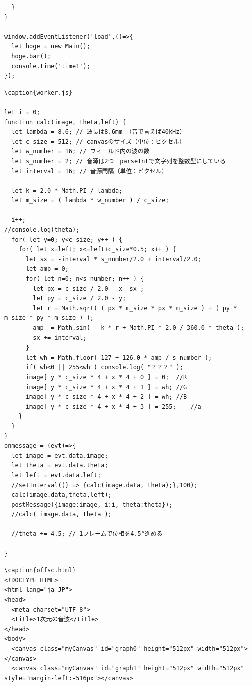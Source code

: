 \documentclass[a4j,12pt]{jsarticle}
\begin{document}
{\begin{lstlisting}
  }
}

window.addEventListener('load',()=>{
  let hoge = new Main();
  hoge.bar();
  console.time('time1');
});

\end{lstlisting}
\newpage

\begin{lstlisting}
\caption{worker.js}

let i = 0;
function calc(image, theta,left) {
  let lambda = 8.6; // 波長は8.6mm （音で言えば40kHz）
  let c_size = 512; // canvasのサイズ（単位：ピクセル）
  let w_number = 16; // フィールド内の波の数
  let s_number = 2; // 音源は2つ　parseIntで文字列を整数型にしている
  let interval = 16; // 音源間隔（単位：ピクセル）

  let k = 2.0 * Math.PI / lambda;
  let m_size = ( lambda * w_number ) / c_size;

  i++;
//console.log(theta);
  for( let y=0; y<c_size; y++ ) {
    for( let x=left; x<=left+c_size*0.5; x++ ) {
      let sx = -interval * s_number/2.0 + interval/2.0;
      let amp = 0;
      for( let n=0; n<s_number; n++ ) {
        let px = c_size / 2.0 - x- sx ;
        let py = c_size / 2.0 - y;
        let r = Math.sqrt( ( px * m_size * px * m_size ) + ( py * m_size * py * m_size ) );
        amp -= Math.sin( - k * r + Math.PI * 2.0 / 360.0 * theta );
        sx += interval;
      }
      let wh = Math.floor( 127 + 126.0 * amp / s_number );
      if( wh<0 || 255<wh ) console.log( "？？？" );
      image[ y * c_size * 4 + x * 4 + 0 ] = 0;  //R
      image[ y * c_size * 4 + x * 4 + 1 ] = wh; //G
      image[ y * c_size * 4 + x * 4 + 2 ] = wh; //B
      image[ y * c_size * 4 + x * 4 + 3 ] = 255;    //a
    }
  }
}
onmessage = (evt)=>{
  let image = evt.data.image;
  let theta = evt.data.theta;
  let left = evt.data.left;
  //setInterval(() => {calc(image.data, theta);},100);
  calc(image.data,theta,left);
  postMessage({image:image, i:i, theta:theta});
  //calc( image.data, theta );

  //theta += 4.5; // 1フレームで位相を4.5°進める

}

\end{lstlisting}
\newpage

\begin{lstlisting}
\caption{offsc.html}
<!DOCTYPE HTML>
<html lang="ja-JP">
<head>
  <meta charset="UTF-8">
  <title>1次元の音波</title>
</head>
<body>
  <canvas class="myCanvas" id="graph0" height="512px" width="512px"></canvas>
  <canvas class="myCanvas" id="graph1" height="512px" width="512px" style="margin-left:-516px"></canvas>


\end{lstlisting}}
\end{document}
